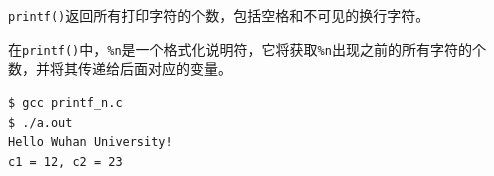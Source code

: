 \begin{frame}[fragile]
\lstinline|printf()|返回所有打印字符的个数，包括空格和不可见的换行字符。
\end{frame}


\begin{frame}[fragile]
  在\lstinline|printf()|中，\lstinline|%n|是一个格式化说明符，它将获取\lstinline|%n|出现之前的所有字符的个数，并将其传递给后面对应的变量。
\end{frame}


\begin{frame}[fragile]

\end{frame}


\begin{frame}[fragile]
\begin{lstlisting}[backgroundcolor=\color{red!20}]
$ gcc printf_n.c
$ ./a.out 
Hello Wuhan University!
c1 = 12, c2 = 23
\end{lstlisting}
\end{frame}



